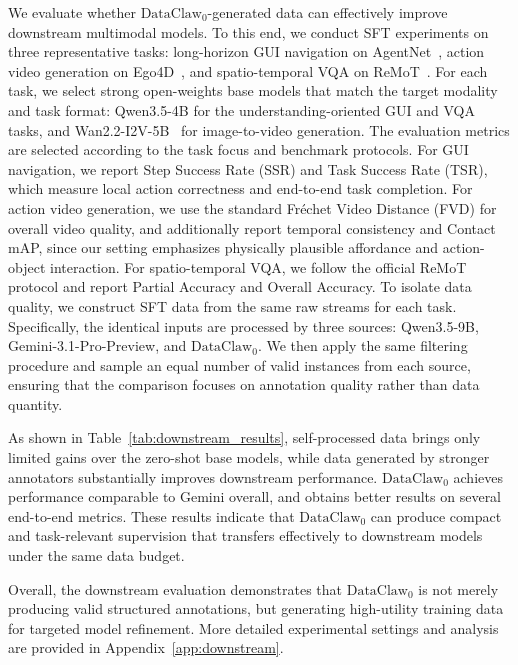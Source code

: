 \documentclass{llmxive}
\begin{document}
We evaluate whether $\text{DataClaw}_0$-generated data can effectively improve downstream multimodal models. To this end, we conduct SFT experiments on three representative tasks: long-horizon GUI navigation on AgentNet~\cite{wang2025opencua}, action video generation on Ego4D~\cite{grauman2022ego4d}, and spatio-temporal VQA on ReMoT~\cite{remot}. 
For each task, we select strong open-weights base models that match the target modality and task format: Qwen3.5-4B for the understanding-oriented GUI and VQA tasks, and Wan2.2-I2V-5B~\cite{wan2025} for image-to-video generation. The evaluation metrics are selected according to the task focus and benchmark protocols. For GUI navigation, we report Step Success Rate (SSR) and Task Success Rate (TSR), which measure local action correctness and end-to-end task completion. For action video generation, we use the standard Fréchet Video Distance (FVD) for overall video quality, and additionally report temporal consistency and Contact mAP, since our setting emphasizes physically plausible affordance and action-object interaction. For spatio-temporal VQA, we follow the official ReMoT protocol and report Partial Accuracy and Overall Accuracy.
To isolate data quality, we construct SFT data from the same raw streams for each task. Specifically, the identical inputs are processed by three sources: Qwen3.5-9B, Gemini-3.1-Pro-Preview, and $\text{DataClaw}_0$. We then apply the same filtering procedure and sample an equal number of valid instances from each source, ensuring that the comparison focuses on annotation quality rather than data quantity.

As shown in Table~\ref{tab:downstream_results}, self-processed data brings only limited gains over the zero-shot base models, while data generated by stronger annotators substantially improves downstream performance. $\text{DataClaw}_0$ achieves performance comparable to Gemini overall, and obtains better results on several end-to-end metrics. These results indicate that $\text{DataClaw}_0$ can produce compact and task-relevant supervision that transfers effectively to downstream models under the same data budget.

Overall, the downstream evaluation demonstrates that $\text{DataClaw}_0$ is not merely producing valid structured annotations, but generating high-utility training data for targeted model refinement. More detailed experimental settings and analysis are provided in Appendix~\ref{app:downstream}.

\end{document}
